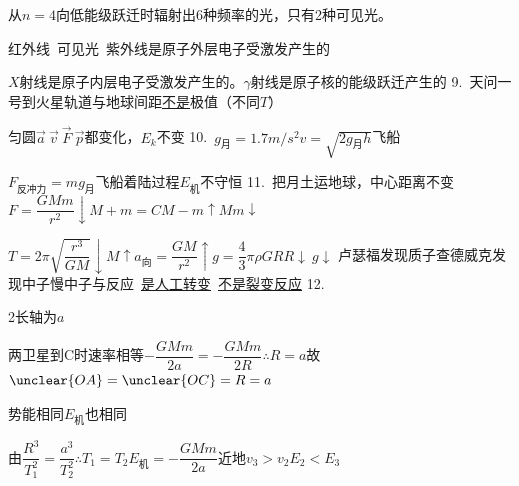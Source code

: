\hspace{1.5em}从$n=4$向低能级跃迁时辐射出6种频率的光，只有2种可见光。

\hspace{1.5em}红外线\ 可见光\ 紫外线是原子外层电子受激发产生的

\hspace{1.5em}$X$射线是原子内层电子受激发产生的。$\gamma$射线是原子核的能级跃迁产生的
9.\ 天问一号到火星轨道与地球间距\underline{不是}极值（不同$T$） %

匀圆\quad $\vec{a}\ \vec{v}\ \vec{F}\ \vec{p}$都变化，$E_k$不变
10.\ $g_{\text{月}}=1.7\unit{m/s^2}$\quad $v=\sqrt{2g_{\text{月}}h}$\quad 飞船

$F_{\text{反冲力}}=mg_{\text{月}}$\quad 飞船着陆过程$E_{\text{机}}$不守恒
11.\ 把月土运地球，中心距离不变\quad $F=\dfrac{GMm}{r^2}\downarrow$\quad $M+m=C$\quad $M-m\uparrow$\quad $Mm\downarrow$ %

\hspace{4em}$T=2\pi\sqrt{\dfrac{r^3}{GM}}\downarrow$\quad $M\uparrow$\quad $a_{\text{向}}=\dfrac{GM}{r^2}\uparrow$\quad $g=\dfrac43\pi\rho GR$\quad $R\downarrow\ g\downarrow$
卢瑟福发现质子\quad 查德威克发现中子\qquad 慢中子与反应\ \underline{是人工转变}\ \underline{不是裂变反应} %
12.

2长轴为$a$

两卫星到C时速率相等\quad $-\dfrac{GMm}{2a}=-\dfrac{GMm}{2R}$\quad $\therefore R=a$\quad 故$\unclear{OA}=\unclear{OC}=R=a$

势能相同\qquad $E_{\text{机}}$也相同

由$\dfrac{R^3}{T_1^2}=\dfrac{a^3}{T_2^2}$\quad $\therefore T_1=T_2$\qquad $E_{\text{机}}=-\dfrac{GMm}{2a}$\qquad 近地$v_3>v_2$\qquad $E_2<E_3$
